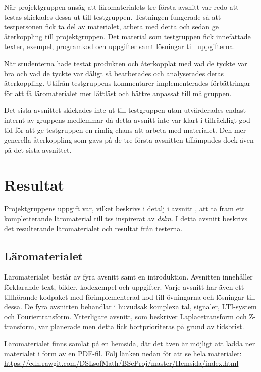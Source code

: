 \documentclass[12pt,a4paper,twoside,openright]{article}
\begin{document}
När projektgruppen ansåg att läromaterialets tre första avsnitt var
redo att testas skickades dessa ut till testgruppen. Testningen
fungerade så att testpersonen fick ta del av materialet, arbeta med
detta och sedan ge återkoppling till projektgruppen.  Det material som
testgruppen fick innefattade texter, exempel, programkod och uppgifter
samt lösningar till uppgifterna.

När studenterna hade testat produkten och återkopplat med vad de
tyckte var bra och vad de tyckte var dåligt så bearbetades och
analyserades deras återkoppling. Utifrån testgruppens kommentarer
implementerades förbättringar för att få läromaterialet mer lättläst
och bättre anpassat till målgruppen.

Det sista avsnittet skickades inte ut till testgruppen utan
utvärderades endast internt av gruppens medlemmar då detta avsnitt
inte var klart i tillräckligt god tid för att ge testgruppen en rimlig
chans att arbeta med materialet. Den mer generella återkoppling som gavs
på de tre första avsnitten tillämpades dock även på det sista
avsnittet.

\newpage

\section{Resultat}
Projektgruppens uppgift var, vilket beskrivs i detalj i avsnitt
, att ta fram ett kompletterande läromaterial
till \gls{tss} inspirerat av \textit{\gls{dslm}}. I detta avsnitt
beskrivs det resulterande läromaterialet och resultat från testerna.

\subsection{Läromaterialet}

Läromaterialet består av fyra avsnitt samt en introduktion. Avsnitten
innehåller förklarande text, bilder, kodexempel och uppgifter. Varje
avsnitt har även ett tillhörande kodpaket med förimplementerad kod
till övningarna och lösningar till dessa. De fyra avsnitten behandlar
i huvudsak komplexa tal, signaler, LTI-system och Fouriertransform.
Ytterligare avsnitt, som beskriver Laplacetransform och Z-transform,
var planerade men detta fick bortprioriteras på grund av tidsbrist.

Läromaterialet finns samlat på en hemsida, där det även är möjligt att
ladda ner materialet i form av en PDF-fil. Följ länken nedan för att
se hela materialet:
\url{https://cdn.rawgit.com/DSLsofMath/BScProj/master/Hemsida/index.html}
\end{document}
